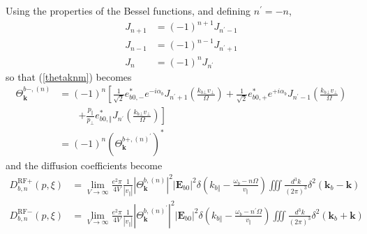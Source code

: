 Using the properties of the Bessel functions, and defining $n^{\prime}=-n$,%
\begin{align}
J_{n+1}  &  =\left(  -1\right)  ^{n+1}J_{n^{\prime}-1}\\
J_{n-1}  &  =\left(  -1\right)  ^{n-1}J_{n^{\prime}+1}\nonumber\\
J_{n}  &  =\left(  -1\right)  ^{n}J_{n^{\prime}}\nonumber
\end{align}
so that (\ref{thetaknm}) becomes%
\begin{align}
\Theta_{\mathbf{k}}^{b-,\left(  n\right)  }  &  =\left(  -1\right)
^{n}\left[  \frac{1}{\sqrt{2}}e_{b0,-}^{\ast}e^{-i\alpha_{b}}J_{n^{\prime}%
+1}\left(  \frac{k_{b\bot}v_{\bot}}{\Omega}\right)  +\frac{1}{\sqrt{2}%
}e_{b0,+}^{\ast}e^{+i\alpha_{b}}J_{n^{\prime}-1}\left(  \frac{k_{b\bot}%
v_{\bot}}{\Omega}\right) \right.\nonumber\\&\qquad\left.
+\frac{p_{\Vert}}{p_{\bot}}e_{b0,\Vert}^{\ast
}J_{n^{\prime}}\left(  \frac{k_{b\bot}v_{\bot}}{\Omega}\right)  \right] \\
&  =\left(  -1\right)  ^{n}\left(  \Theta_{\mathbf{k}}^{b+,\left(  n\right)
^{\prime}}\right)  ^{\ast}%
\end{align}
and the diffusion coefficients become%
\begin{align}
D_{b,n}^{\text{RF}+}(p,\xi)  &  =\lim_{V\rightarrow\infty}\frac{e^{2}\pi}%
{4V}\frac{1}{\left|  v_{\Vert}\right|  }\left|  \Theta_{\mathbf{k}}^{b,\left(
n\right)  }\right|  ^{2}\left|  \mathbf{E}_{b0}\right|  ^{2}\delta\left(
k_{b\Vert}-\frac{\omega_{b}-n\Omega}{v_{\Vert}}\right)  \iiint\frac{d^{3}%
k}{(2\pi)^{3}}\delta^{2}\left(  \mathbf{k}_{b}-\mathbf{k}\right) \\
D_{b,n}^{\text{RF}-}(p,\xi)  &  =\lim_{V\rightarrow\infty}\frac{e^{2}\pi}%
{4V}\frac{1}{\left|  v_{\Vert}\right|  }\left|  \Theta_{\mathbf{k}}^{b,\left(
n\right)  ^{\prime}}\right|  ^{2}\left|  \mathbf{E}_{b0}\right|  ^{2}%
\delta\left(  k_{b\Vert}-\frac{\omega_{b}-n^{\prime}\Omega}{v_{\Vert}}\right)
\iiint\frac{d^{3}k}{(2\pi)^{3}}\delta^{2}\left(  \mathbf{k}_{b}+\mathbf{k}%
\right) \nonumber
\end{align}

